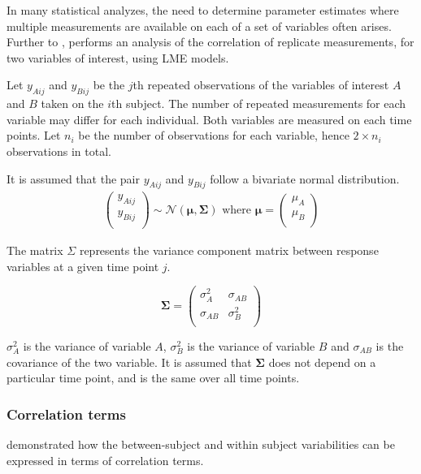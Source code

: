 \documentclass[12pt, a4paper]{report}
\theoremstyle{plain}
\theoremstyle{definition}
\theoremstyle{remark}
\begin{document}
	In many statistical analyzes, the need to determine parameter estimates where multiple measurements are available on each of a set of variables often arises. Further to \citet{lam}, \citet{hamlett} performs an analysis of the correlation of replicate measurements, for two variables of interest, using LME models.
	
	Let $y_{Aij}$ and $y_{Bij}$ be the $j$th repeated observations of the variables of interest $A$ and $B$ taken on the $i$th subject. The number of repeated measurements for each variable may differ for each individual.
	Both variables are measured on each time points. Let $n_{i}$ be the number of observations for each variable, hence $2\times n_{i}$ observations in total.
	
	It is assumed that the pair $y_{Aij}$ and $y_{Bij}$ follow a bivariate normal distribution.
	\begin{eqnarray*}
		\left(
		\begin{array}{c}
			y_{Aij} \\
			y_{Bij} \\
		\end{array}
		\right) \sim \mathcal{N}(
		\boldsymbol{\mu}, \boldsymbol{\Sigma})\mbox{   where } \boldsymbol{\mu} = \left(
		\begin{array}{c}
			\mu_{A} \\
			\mu_{B} \\
		\end{array}
		\right)
	\end{eqnarray*}
	
	The matrix $\Sigma$ represents the variance component matrix between response variables at a given time point $j$.
	
	\[
	\boldsymbol{\Sigma} = \left( \begin{array}{cc}
	\sigma^2_{A} & \sigma_{AB} \\
	\sigma_{AB} & \sigma^2_{B}\\
	\end{array}   \right)
	\]
	
	$\sigma^2_{A}$ is the variance of variable $A$, $\sigma^2_{B}$ is the variance of variable $B$ and $\sigma_{AB}$ is the covariance of the two variable. It is assumed that $\boldsymbol{\Sigma}$ does not depend on a particular time point, and is the same over all time points.
	
	
	\subsubsection{Correlation terms}
	\citet{hamlett} demonstrated how the between-subject and within subject variabilities can be expressed in terms of
	correlation terms.
	
\end{document}

